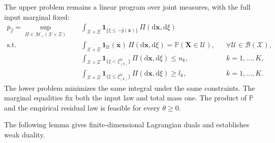 \documentclass[review,11pt,3p,authoryear,nopreprintline]{elsarticle}
\begin{document}
The upper problem remains a linear program over joint measures, with the full input marginal fixed:
\begin{equation}
  \begin{aligned}
    \overline p_{\hat f}
    =\sup_{\Pi\in\mathcal M_+(\mathcal X\times\Xi)}\quad&
      \int_{\mathcal X\times\Xi}\mathbf1_{\{\xi\le-\hat g(\bm x)\}}\,\Pi(\mathrm d\bm x,\mathrm d\xi)\\
    \text{s.t.}\quad&
      \int_{\mathcal X\times\Xi}\mathbf1_{\mathcal U}(\bm x)\,\Pi(\mathrm d\bm x,\mathrm d\xi)
        =\mathbb P(\bm X\in\mathcal U),&&\forall\mathcal U\in\mathcal B(\mathcal X),\\
    &\int_{\mathcal X\times\Xi}\mathbf1_{\{\xi<\xi_{(k)}^{\mathrm{te}}\}}\,\Pi(\mathrm d\bm x,\mathrm d\xi)\le u_k,
        &&k=1,\ldots,K,\\
    &\int_{\mathcal X\times\Xi}\mathbf1_{\{\xi\le\xi_{(k)}^{\mathrm{te}}\}}\,\Pi(\mathrm d\bm x,\mathrm d\xi)\ge l_k,
        &&k=1,\ldots,K.
  \end{aligned}
  \label{eq-measure-upper}
\end{equation}
The lower problem minimizes the same integral under the same constraints. The marginal equalities fix both the input law and total mass one. The product of $\mathbb P$ and the empirical residual law is feasible for every $\theta\ge0$.

The following lemma gives finite-dimensional Lagrangian duals and establishes weak duality.
\end{document}
